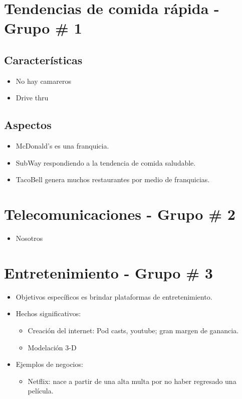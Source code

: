 \section{Tendencias de comida rápida - Grupo \# 1}
\subsection{Características}
\begin{itemize}
    \item No hay camareros 
    \item Drive thru 
\end{itemize}

\subsection{Aspectos}
\begin{itemize}
    \item McDonald's es una franquicia. 
    \item SubWay respondiendo a la tendencia de comida saludable.
    \item TacoBell genera muchos restaurantes por medio de franquicias.
\end{itemize}



\section{Telecomunicaciones - Grupo \# 2}
\begin{itemize}
    \item Nosotros
\end{itemize}




\section{Entretenimiento - Grupo \# 3}
\begin{itemize}
    \item Objetivos específicos es brindar plataformas de entretenimiento.
    \item Hechos significativos:
        \begin{itemize}
            \item Creación del internet: Pod casts, youtube; gran margen de ganancia.
            \item Modelación 3-D
        \end{itemize}
    
    \item Ejemplos de negocios:
        \begin{itemize}
            \item Netflix: nace a partir de una alta multa por no haber regresado una película.
        \end{itemize}
\end{itemize}
